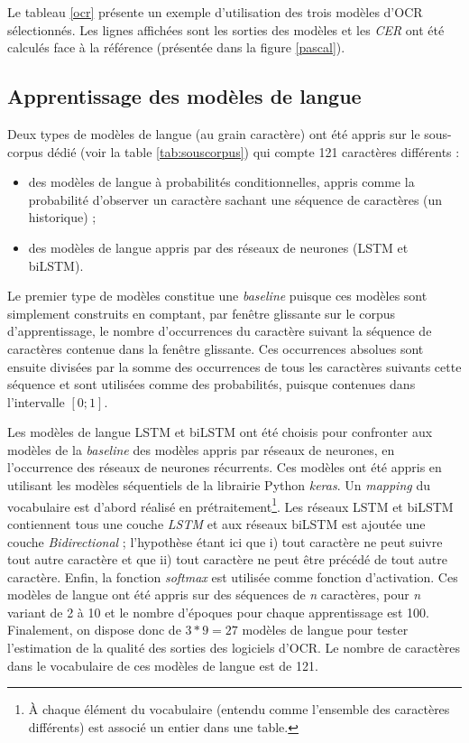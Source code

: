 \documentclass[10pt,twoside]{article}
\begin{document}
    Le tableau \ref{ocr} présente un exemple d'utilisation des trois modèles d'OCR sélectionnés. Les lignes affichées sont les sorties des modèles et les \textit{CER}
    ont été calculés face à la référence (présentée dans la figure \ref{pascal}).

    \subsection{Apprentissage des modèles de langue}
    Deux types de modèles de langue (au grain caractère) ont été appris sur le sous-corpus dédié (voir la table \ref{tab:souscorpus})
    qui compte 121 caractères différents :
    \begin{itemize}
      \item des modèles de langue à probabilités conditionnelles, appris comme la probabilité d'observer un caractère 
      sachant une séquence de caractères (un historique) ;
      \item des modèles de langue appris par des réseaux de neurones (LSTM et biLSTM).
    \end{itemize}
    Le premier type de modèles constitue une \textit{baseline} puisque ces modèles sont simplement construits en comptant, 
    par fenêtre glissante sur le corpus d'apprentissage, le nombre d'occurrences du caractère suivant
    la séquence de caractères contenue dans la fenêtre glissante. Ces occurrences absolues sont ensuite 
    divisées par la somme des occurrences de tous les caractères suivants cette séquence et sont utilisées
    comme des probabilités, puisque contenues dans l'intervalle $\left[0;1\right]$. 

    Les modèles de langue LSTM et biLSTM ont été choisis pour confronter aux modèles de la \textit{baseline} 
    des modèles appris par réseaux de neurones, en l'occurrence des réseaux de neurones récurrents. 
    Ces modèles ont été appris en utilisant les modèles séquentiels de la librairie Python \textit{keras}. Un \textit{mapping} du vocabulaire
    est d'abord réalisé en prétraitement\footnote{\`{A} chaque élément du vocabulaire (entendu comme l'ensemble des caractères 
    différents) est associé un entier dans une table.}. Les réseaux LSTM et biLSTM contiennent tous une couche 
    \textit{LSTM} et aux réseaux biLSTM est ajoutée une couche \textit{Bidirectional} ; l'hypothèse étant ici que
    i) tout caractère ne peut suivre tout autre caractère et que
    ii) tout caractère ne peut être précédé de tout autre caractère.
    Enfin, la fonction \textit{softmax} est utilisée comme fonction d'activation. Ces modèles de langue ont été appris sur des séquences de \textit{n} 
    caractères, pour \textit{n} variant de 2 à 10 et le nombre d'époques pour chaque apprentissage est 100. 
    Finalement, on dispose donc de $3 * 9 = 27$ modèles de langue
    pour tester l'estimation de la qualité des sorties des logiciels d'OCR. Le nombre de caractères dans le vocabulaire de ces
    modèles de langue est de 121.
\end{document}
